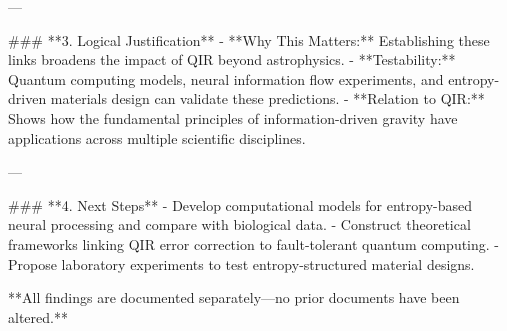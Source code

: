 ---

### **3. Logical Justification**
- **Why This Matters:** Establishing these links broadens the impact of QIR beyond astrophysics.
- **Testability:** Quantum computing models, neural information flow experiments, and entropy-driven materials design can validate these predictions.
- **Relation to QIR:** Shows how the fundamental principles of information-driven gravity have applications across multiple scientific disciplines.

---

### **4. Next Steps**
- Develop computational models for entropy-based neural processing and compare with biological data.
- Construct theoretical frameworks linking QIR error correction to fault-tolerant quantum computing.
- Propose laboratory experiments to test entropy-structured material designs.

**All findings are documented separately—no prior documents have been altered.**

